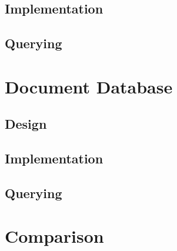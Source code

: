 \documentclass[11pt,a4paper]{article}
\begin{document}
\subsection{Implementation}
\subsection{Querying}

\section{Document Database}
\subsection{Design}
\subsection{Implementation}
\subsection{Querying}

\section{Comparison}
\end{document}
